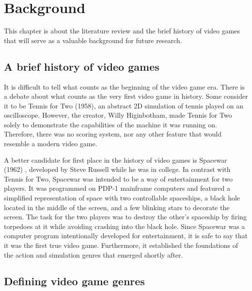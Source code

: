 \chapter{Background} \label{Chapter:Background}

This chapter is about the literature review and the brief history of video games that will serve as a valuable background for future research.

\section{A brief history of video games}

It is difficult to tell what counts as the beginning of the video game era. There is a debate about what counts as the very first video game in history. Some consider it to be Tennis for Two (1958)\cite{tennisfortwo1958}, an abstract 2D simulation of tennis played on an oscilloscope. However, the creator, Willy Higinbotham, made Tennis for Two solely to demonstrate the capabilities of the machine it was running on. Therefore, there was no scoring system, nor any other feature that would resemble a modern video game\cite{malliet2005history}.

A better candidate for first place in the history of video games is Spacewar (1962) \cite{spacewar1962}, developed by Steve Russell while he was in college. In contrast with Tennis for Two, Spacewar was intended to be a way of entertainment for two players. It was programmed on PDP-1 mainframe computers and featured a simplified representation of space with two controllable spaceships, a black hole located in the middle of the screen, and a few blinking stars to decorate the screen. The task for the two players was to destroy the other's spaceship by firing torpedoes at it while avoiding crashing into the black hole. Since Spacewar was a computer program intentionally developed for entertainment, it is safe to say that it was the first true video game. Furthermore, it established the foundations of the action and simulation genres that emerged shortly after\cite{malliet2005history}.



\section{Defining video game genres}

